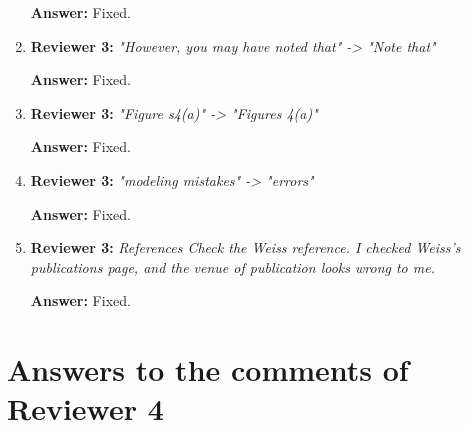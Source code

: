 \documentclass[letterpaper]{article}
\begin{document}
\begin{enumerate}
\textbf{Answer:} Fixed.

\item \textbf{Reviewer 3:} \emph{ "However, you may have noted that" -> "Note that"}

\textbf{Answer:} Fixed.

\item \textbf{Reviewer 3:} \emph{ "Figure s4(a)" -> "Figures 4(a)"}

\textbf{Answer:} Fixed.

\item \textbf{Reviewer 3:} \emph{ "modeling mistakes" -> "errors"}

\textbf{Answer:} Fixed.

\item \textbf{Reviewer 3:} \emph{ References Check the Weiss reference.  I checked Weiss's publications page, and the venue of publication looks wrong to me. }

\textbf{Answer:} Fixed.

\end{enumerate}


\section{Answers to the comments of Reviewer 4} \label{sec:reviewer4}
\end{document}
